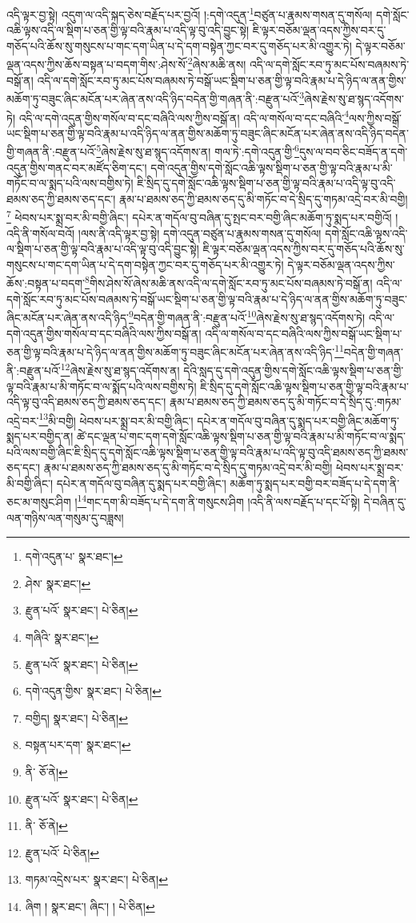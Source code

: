 འདི་ལྟར་བྱ་སྟེ། འདུག་ལ་འདི་སྐད་ཅེས་བརྗོད་པར་བྱའོ། །:དགེ་འདུན་\footnote{དགེ་འདུན་པ་  སྣར་ཐང་། }བཙུན་པ་རྣམས་གསན་དུ་གསོལ། དགེ་སློང་འཆི་ལྟས་འདི་ལ་སྡིག་པ་ཅན་གྱི་ལྟ་བའི་རྣམ་པ་འདི་ལྟ་བུ་འདི་བྱུང་སྟེ། ཇི་ལྟར་བཅོམ་ལྡན་འདས་ཀྱིས་བར་དུ་གཅོད་པའི་ཆོས་སུ་གསུངས་པ་གང་དག་ཡིན་པ་དེ་དག་བསྟེན་ཀྱང་བར་དུ་གཅོད་པར་མི་འགྱུར་ཏེ། དེ་ལྟར་བཅོམ་ལྡན་འདས་ཀྱིས་ཆོས་བསྟན་པ་བདག་གིས་:ཤེས་སོ་\footnote{ཤེས་  སྣར་ཐང་། }ཞེས་མཆི་ནས། འདི་ལ་དགེ་སློང་རབ་ཏུ་མང་པོས་བཞམས་ཏེ་བསྒོ་ན། འདི་ལ་དགེ་སློང་རབ་ཏུ་མང་པོས་བཞམས་ཏེ་བསྒོ་ཡང་སྡིག་པ་ཅན་གྱི་ལྟ་བའི་རྣམ་པ་དེ་ཉིད་ལ་ནན་གྱིས་མཆོག་ཏུ་བཟུང་ཞིང་མངོན་པར་ཞེན་ནས་འདི་ཉིད་བདེན་གྱི་གཞན་ནི་:བརྫུན་པའོ་\footnote{རྫུན་པའོ་  སྣར་ཐང་།  པེ་ཅིན། }ཞེས་རྗེས་སུ་ཐ་སྙད་འདོགས་ཏེ། འདི་ལ་དགེ་འདུན་གྱིས་གསོལ་བ་དང་བཞིའི་ལས་ཀྱིས་བསྒོ་ན། འདི་ལ་གསོལ་བ་དང་བཞིའི་\footnote{གཞིའི་  སྣར་ཐང་། }ལས་ཀྱིས་བསྒོ་ཡང་སྡིག་པ་ཅན་གྱི་ལྟ་བའི་རྣམ་པ་འདི་ཉིད་ལ་ནན་གྱིས་མཆོག་ཏུ་བཟུང་ཞིང་མངོན་པར་ཞེན་ནས་འདི་ཉིད་བདེན་གྱི་གཞན་ནི་:བརྫུན་པའོ་\footnote{རྫུན་པའོ་  སྣར་ཐང་།  པེ་ཅིན། }ཞེས་རྗེས་སུ་ཐ་སྙད་འདོགས་ན། གལ་ཏེ་:དགེ་འདུན་གྱི་\footnote{དགེ་འདུན་གྱིས་  སྣར་ཐང་།  པེ་ཅིན། }དུས་ལ་བབ་ཅིང་བཟོད་ན་དགེ་འདུན་གྱིས་གནང་བར་མཛོད་ཅིག་དང་། དགེ་འདུན་གྱིས་དགེ་སློང་འཆི་ལྟས་སྡིག་པ་ཅན་གྱི་ལྟ་བའི་རྣམ་པ་མི་གཏོང་བ་ལ་སྨད་པའི་ལས་བགྱིས་ཏེ། ཇི་སྲིད་དུ་དགེ་སློང་འཆི་ལྟས་སྡིག་པ་ཅན་གྱི་ལྟ་བའི་རྣམ་པ་འདི་ལྟ་བུ་འདི་ཐམས་ཅད་ཀྱི་ཐམས་ཅད་དང་། རྣམ་པ་ཐམས་ཅད་ཀྱི་ཐམས་ཅད་དུ་མི་གཏོང་བ་དེ་སྲིད་དུ་གཏམ་འདྲེ་བར་མི་བགྱི།\footnote{བགྱིད།  སྣར་ཐང་།  པེ་ཅིན། } ཕེབས་པར་སྨྲ་བར་མི་བགྱི་ཞིང་། དཔེར་ན་གདོལ་བུ་བཞིན་དུ་སྤང་བར་བགྱི་ཞིང་མཆོག་ཏུ་སྨད་པར་བགྱིའོ། །འདི་ནི་གསོལ་བའོ། །ལས་ནི་འདི་ལྟར་བྱ་སྟེ། དགེ་འདུན་བཙུན་པ་རྣམས་གསན་དུ་གསོལ། དགེ་སློང་འཆི་ལྟས་འདི་ལ་སྡིག་པ་ཅན་གྱི་ལྟ་བའི་རྣམ་པ་འདི་ལྟ་བུ་འདི་བྱུང་སྟེ། ཇི་ལྟར་བཅོམ་ལྡན་འདས་ཀྱིས་བར་དུ་གཅོད་པའི་ཆོས་སུ་གསུངས་པ་གང་དག་ཡིན་པ་དེ་དག་བསྟེན་ཀྱང་བར་དུ་གཅོད་པར་མི་འགྱུར་ཏེ། དེ་ལྟར་བཅོམ་ལྡན་འདས་ཀྱིས་ཆོས་:བསྟན་པ་བདག་\footnote{བསྟན་པར་དག་  སྣར་ཐང་། }གིས་ཤེས་སོ་ཞེས་མཆི་ནས་འདི་ལ་དགེ་སློང་རབ་ཏུ་མང་པོས་བཞམས་ཏེ་བསྒོ་ན། འདི་ལ་དགེ་སློང་རབ་ཏུ་མང་པོས་བཞམས་ཏེ་བསྒོ་ཡང་སྡིག་པ་ཅན་གྱི་ལྟ་བའི་རྣམ་པ་དེ་ཉིད་ལ་ནན་གྱིས་མཆོག་ཏུ་བཟུང་ཞིང་མངོན་པར་ཞེན་ནས་འདི་ཉིད་\footnote{ནི་  ཅོ་ནེ། }བདེན་གྱི་གཞན་ནི་:བརྫུན་པའོ་\footnote{རྫུན་པའོ་  སྣར་ཐང་།  པེ་ཅིན། }ཞེས་རྗེས་སུ་ཐ་སྙད་འདོགས་ཏེ། འདི་ལ་དགེ་འདུན་གྱིས་གསོལ་བ་དང་བཞིའི་ལས་ཀྱིས་བསྒོ་ན། འདི་ལ་གསོལ་བ་དང་བཞིའི་ལས་ཀྱིས་བསྒོ་ཡང་སྡིག་པ་ཅན་གྱི་ལྟ་བའི་རྣམ་པ་དེ་ཉིད་ལ་ནན་གྱིས་མཆོག་ཏུ་བཟུང་ཞིང་མངོན་པར་ཞེན་ནས་འདི་ཉིད་\footnote{ནི་  ཅོ་ནེ། }བདེན་གྱི་གཞན་ནི་:བརྫུན་པའོ་\footnote{རྫུན་པའོ་  པེ་ཅིན། }ཞེས་རྗེས་སུ་ཐ་སྙད་འདོགས་ན། དེའི་སླད་དུ་དགེ་འདུན་གྱིས་དགེ་སློང་འཆི་ལྟས་སྡིག་པ་ཅན་གྱི་ལྟ་བའི་རྣམ་པ་མི་གཏོང་བ་ལ་སྨོད་པའི་ལས་བགྱིས་ཏེ། ཇི་སྲིད་དུ་དགེ་སློང་འཆི་ལྟས་སྡིག་པ་ཅན་གྱི་ལྟ་བའི་རྣམ་པ་འདི་ལྟ་བུ་འདི་ཐམས་ཅད་ཀྱི་ཐམས་ཅད་དང་། རྣམ་པ་ཐམས་ཅད་ཀྱི་ཐམས་ཅད་དུ་མི་གཏོང་བ་དེ་སྲིད་དུ་:གཏམ་འདྲེ་བར་\footnote{གཏམ་འདྲེས་པར་  སྣར་ཐང་།  པེ་ཅིན། }མི་བགྱི། ཕེབས་པར་སྨྲ་བར་མི་བགྱི་ཞིང་། དཔེར་ན་གདོལ་བུ་བཞིན་དུ་སྨད་པར་བགྱི་ཞིང་མཆོག་ཏུ་སྨད་པར་བགྱིད་ན། ཚེ་དང་ལྡན་པ་གང་དག་དགེ་སློང་འཆི་ལྟས་སྡིག་པ་ཅན་གྱི་ལྟ་བའི་རྣམ་པ་མི་གཏོང་བ་ལ་སྨད་པའི་ལས་བགྱི་ཞིང་ཇི་སྲིད་དུ་དགེ་སློང་འཆི་ལྟས་སྡིག་པ་ཅན་གྱི་ལྟ་བའི་རྣམ་པ་འདི་ལྟ་བུ་འདི་ཐམས་ཅད་ཀྱི་ཐམས་ཅད་དང་། རྣམ་པ་ཐམས་ཅད་ཀྱི་ཐམས་ཅད་དུ་མི་གཏོང་བ་དེ་སྲིད་དུ་གཏམ་འདྲེ་བར་མི་བགྱི། ཕེབས་པར་སྨྲ་བར་མི་བགྱི་ཞིང་། དཔེར་ན་གདོལ་བུ་བཞིན་དུ་སྨད་པར་བགྱི་ཞིང་། མཆོག་ཏུ་སྨད་པར་བགྱི་བར་བཟོད་པ་དེ་དག་ནི་ཅང་མ་གསུང་ཤིག །\footnote{ཞིག །  སྣར་ཐང་། ཞིང་། །  པེ་ཅིན། }གང་དག་མི་བཟོད་པ་དེ་དག་ནི་གསུངས་ཤིག །འདི་ནི་ལས་བརྗོད་པ་དང་པོ་སྟེ། དེ་བཞིན་དུ་ལན་གཉིས་ལན་གསུམ་དུ་བཟླས། 